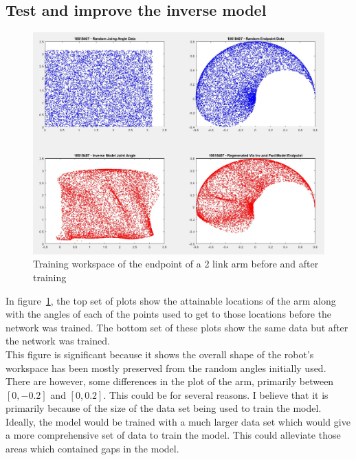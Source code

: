 \documentclass [11pt]{article}
\begin{document}
\subsection{Test and improve the inverse model}

\begin{figure}[H]
\centerline{\includegraphics[width=15cm]{training_workspace_of_the_endpoint-of_a_2-link_arm}}
\caption{Training workspace of the endpoint of a 2 link arm before and after training}
\label{fig:Training Workspace of the endpoint of a 2 link arm before and after training}
\end{figure}

In figure~\ref{fig:Training Workspace of the endpoint of a 2 link arm before and after training}, the top set of plots show the attainable locations of the arm along with the angles of each of the points used to get to those locations before the network was trained. The bottom set of these plots show the same data but after the network was trained. \\
This figure is significant because it shows the overall shape of the robot's workspace has been mostly preserved from the random angles initially used. There are however, some differences in the plot of the arm, primarily between $[0, -0.2]$ and $[0, 0.2]$. This could be for several reasons. I believe that it is primarily because of the size of the data set being used to train the model. Ideally, the model would be trained with a much larger data set which would give a more comprehensive set of data to train the model. This could alleviate those areas which contained gaps in the model. 
\end{document}
